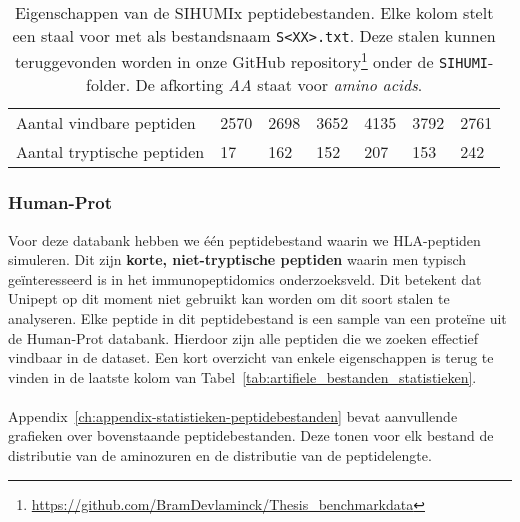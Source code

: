 \begin{table}[H]
\begin{minipage}{\linewidth}
{\begin{tabular}{ l l l l l l l }
                Aantal vindbare peptiden   & 2570                & 2698                & 3652                & 4135                & 3792                & 2761                \\
                Aantal tryptische peptiden & 17\thinspace263     & 162                 & 152                 & 207                 & 153                 & 242                 \\
                \hline
            \end{tabular}}
        \caption{Eigenschappen van de SIHUMIx peptidebestanden. Elke kolom stelt een staal voor met als bestandsnaam \texttt{S<XX>.txt}. Deze stalen kunnen teruggevonden worden in onze GitHub repository\protect\footnote{\url{https://github.com/BramDevlaminck/Thesis\_benchmarkdata}} onder de \texttt{SIHUMI}-folder. De afkorting \textit{AA} staat voor \textit{amino acids}.} %
        \label{tab:sihumi_zoekbestanden}
    \end{minipage}
\end{table}

\subsubsection{Human-Prot}
Voor deze databank hebben we één peptidebestand waarin we HLA-peptiden simuleren.
Dit zijn \textbf{korte, niet-tryptische peptiden} waarin men typisch geïnteresseerd is in het immunopeptidomics onderzoeksveld.
Dit betekent dat Unipept op dit moment niet gebruikt kan worden om dit soort stalen te analyseren.
Elke peptide in dit peptidebestand is een sample van een proteïne uit de Human-Prot databank.
Hierdoor zijn alle peptiden die we zoeken effectief vindbaar in de dataset.
Een kort overzicht van enkele eigenschappen is terug te vinden in de laatste kolom van Tabel~\ref{tab:artifiele_bestanden_statistieken}.
\\ \\
Appendix~\ref{ch:appendix-statistieken-peptidebestanden} bevat aanvullende grafieken over bovenstaande peptidebestanden.
Deze tonen voor elk bestand de distributie van de aminozuren en de distributie van de peptidelengte.


